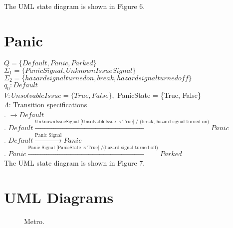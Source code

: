 \documentclass[12pt]{article}
\begin{document}
\begin{spacing}{1.5}
\noindent The UML state diagram is shown in Figure 6.

\newpage

\section{Panic}

\noindent $Q = \{Default, Panic, Parked\}$\\
\noindent $\Sigma_1 = \{Panic Signal, UnknownIssueSignal\}$\\
\noindent $\Sigma_2 = \{hazard signal turned on, break, hazard signal turned off\}$\\
\noindent $q_0: Default$\\
\noindent $V: UnsolvableIssue = \{True, False\}, $ PanicState = \{True, False\}\\
\noindent $\Lambda$: Transition specifications\\

. $\rightarrow Default$\\
. $Default \xrightarrow {\text {UnknownIssueSignal [UnsolvableIssue is True] / (break;~hazard~signal~turned on)}} Panic$\\
. $Default \xrightarrow {\text {Panic Signal}} Panic$\\
. $Panic \xrightarrow {\text {Panic Signal [PanicState is True] /(hazard~signal~turned~off)}} Parked$\\


\noindent The UML state diagram is shown in Figure 7.

\newpage

\section{UML Diagrams}

\begin{figure}[h!]
	\centering
		
		  \caption{Metro.}
  \label{fig:metro-fig}
\end{figure}

\end{spacing}
\end{document}
